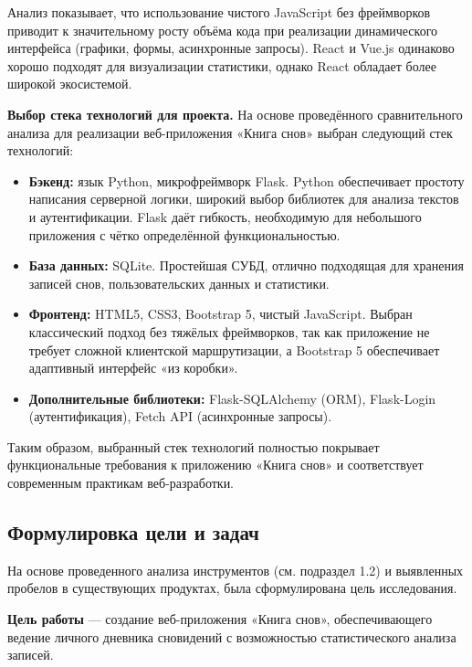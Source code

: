 \documentclass[14pt, a4paper]{extarticle}
\begin{document}
\newpage
Анализ показывает, что использование чистого JavaScript без фреймворков
приводит к значительному росту объёма кода при реализации динамического
интерфейса (графики, формы, асинхронные запросы). React и Vue.js
одинаково хорошо подходят для визуализации статистики, однако React
обладает более широкой экосистемой.

\textbf{Выбор стека технологий для проекта.} На основе проведённого сравнительного анализа для реализации
веб-приложения «Книга снов» выбран следующий стек технологий:

\begin{itemize}
	\item \textbf{Бэкенд:} язык Python, микрофреймворк Flask.
	      Python обеспечивает простоту написания серверной логики,
	      широкий выбор библиотек для анализа текстов и аутентификации.
	      Flask даёт гибкость, необходимую для небольшого приложения
	      с чётко определённой функциональностью.
	\item \textbf{База данных:} SQLite.
	      Простейшая СУБД, отлично подходящая для хранения записей
	      снов, пользовательских данных и статистики.
	\item \textbf{Фронтенд:} HTML5, CSS3, Bootstrap 5, чистый JavaScript.
	      Выбран классический подход без тяжёлых фреймворков, так как
	      приложение не требует сложной клиентской маршрутизации,
	      а Bootstrap 5 обеспечивает адаптивный интерфейс «из коробки».
	\item \textbf{Дополнительные библиотеки:} Flask-SQLAlchemy (ORM),
	      Flask-Login (аутентификация), Fetch API (асинхронные запросы).
\end{itemize}

Таким образом, выбранный стек технологий полностью покрывает
функциональные требования к приложению «Книга снов» и соответствует
современным практикам веб-разработки.

\newpage

\subsection{Формулировка цели и задач}

На основе проведенного анализа инструментов (см. подраздел 1.2) и выявленных пробелов в существующих продуктах, была сформулирована цель исследования.

\textbf{Цель работы} — создание веб-приложения «Книга снов», обеспечивающего ведение личного дневника сновидений с возможностью статистического анализа записей.
\end{document}
